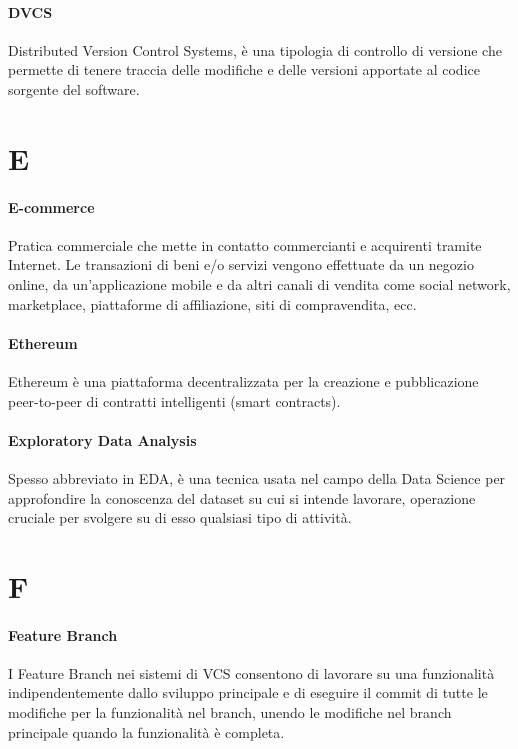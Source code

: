 \documentclass[]{article}
\begin{document}
	\paragraph*{DVCS}
	Distributed Version Control Systems, è una tipologia di controllo di versione che permette di tenere traccia delle modifiche e delle versioni apportate al codice sorgente del software.

	\newpage

	\section*{E}

	\paragraph*{E-commerce}
	Pratica commerciale che mette in contatto commercianti e acquirenti tramite Internet. Le transazioni di beni e/o servizi vengono effettuate da un negozio online, da un'applicazione mobile e da altri canali di vendita come social network, marketplace, piattaforme di affiliazione, siti di compravendita, ecc.

	\paragraph*{Ethereum}
	Ethereum è una piattaforma decentralizzata per la creazione e pubblicazione peer-to-peer di contratti intelligenti (smart contracts).

	\paragraph*{Exploratory Data Analysis}
	Spesso abbreviato in EDA, è una tecnica usata nel campo della Data Science per approfondire la conoscenza del dataset su cui si intende lavorare, operazione cruciale per svolgere su di esso qualsiasi tipo di attività.

	\newpage

	\section*{F}

	\paragraph*{Feature Branch}
	I Feature Branch nei sistemi di VCS consentono di lavorare su una funzionalità indipendentemente dallo sviluppo principale e di eseguire il commit di tutte le modifiche per la funzionalità nel branch, unendo le modifiche nel branch principale quando la funzionalità è completa.
\end{document}
